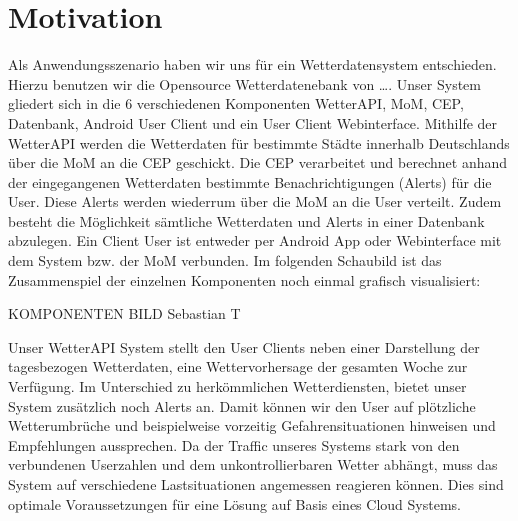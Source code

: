 \section{Motivation}

Als Anwendungsszenario haben wir uns für ein Wetterdatensystem entschieden. Hierzu benutzen wir die Opensource Wetterdatenebank von …. Unser System gliedert sich in die 6 verschiedenen Komponenten WetterAPI, MoM, CEP, Datenbank, Android  User Client und ein User Client Webinterface. Mithilfe der WetterAPI werden die Wetterdaten für bestimmte Städte innerhalb Deutschlands über die MoM an die CEP geschickt. Die CEP verarbeitet und berechnet anhand der eingegangenen Wetterdaten bestimmte Benachrichtigungen (Alerts) für die User. Diese Alerts werden wiederrum über die MoM an die User verteilt.  Zudem besteht die Möglichkeit sämtliche Wetterdaten und Alerts in einer Datenbank abzulegen. Ein Client User ist entweder per Android App oder Webinterface mit dem System bzw. der MoM verbunden.
Im folgenden Schaubild ist das Zusammenspiel der einzelnen Komponenten noch einmal grafisch visualisiert:

KOMPONENTEN BILD Sebastian T

Unser WetterAPI System stellt den User Clients neben einer Darstellung der tagesbezogen Wetterdaten, eine Wettervorhersage der gesamten Woche zur Verfügung. Im Unterschied zu herkömmlichen Wetterdiensten, bietet unser System zusätzlich noch Alerts an. Damit  können wir den User auf plötzliche Wetterumbrüche und beispielweise vorzeitig Gefahrensituationen hinweisen und Empfehlungen aussprechen. 
Da der Traffic unseres Systems stark von den verbundenen Userzahlen und dem unkontrollierbaren Wetter abhängt, muss  das System auf verschiedene Lastsituationen angemessen reagieren können. Dies sind optimale Voraussetzungen für eine Lösung auf Basis eines Cloud Systems.
